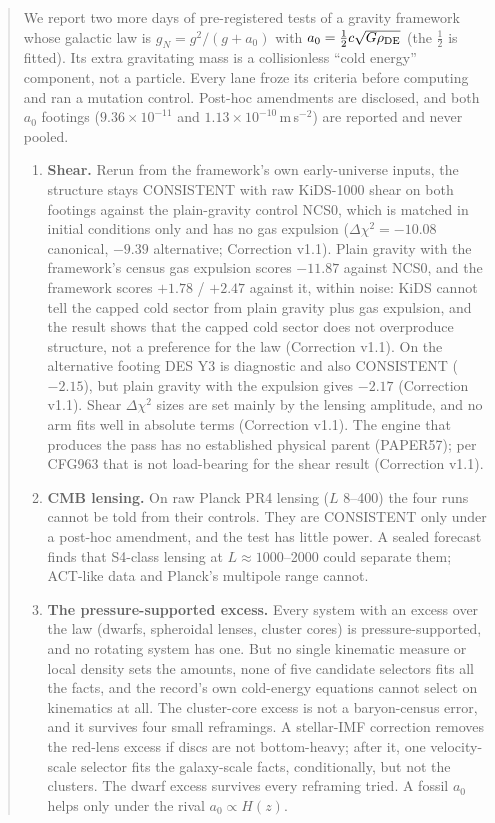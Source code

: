 \documentclass[10pt]{article}
\begin{document}
\begin{abstract}\noindent
We report two more days of pre-registered tests of a gravity framework whose galactic law is $g_N=g^2/(g+a_0)$ with $a_0=\tfrac12 c\sqrt{G\rho_{\rm DE}}$ (the $\tfrac12$ is fitted). Its extra gravitating mass is a collisionless ``cold energy'' component, not a particle. Every lane froze its criteria before computing and ran a mutation control. Post-hoc amendments are disclosed, and both $a_0$ footings ($9.36\times10^{-11}$ and $1.13\times10^{-10}$\,m\,s$^{-2}$) are reported and never pooled.
\begin{enumerate}
\item \textbf{Shear.} Rerun from the framework's own early-universe inputs, the structure stays CONSISTENT with raw KiDS-1000 shear on both footings against the plain-gravity control NCS0, which is matched in initial conditions only and has no gas expulsion ($\Delta\chi^2=-10.08$ canonical, $-9.39$ alternative; Correction v1.1). Plain gravity with the framework's census gas expulsion scores $-11.87$ against NCS0, and the framework scores $+1.78$ / $+2.47$ against it, within noise: KiDS cannot tell the capped cold sector from plain gravity plus gas expulsion, and the result shows that the capped cold sector does not overproduce structure, not a preference for the law (Correction v1.1). On the alternative footing DES Y3 is diagnostic and also CONSISTENT ($-2.15$), but plain gravity with the expulsion gives $-2.17$ (Correction v1.1). Shear $\Delta\chi^2$ sizes are set mainly by the lensing amplitude, and no arm fits well in absolute terms (Correction v1.1). The engine that produces the pass has no established physical parent (PAPER57); per CFG963 that is not load-bearing for the shear result (Correction v1.1).
\item \textbf{CMB lensing.} On raw Planck PR4 lensing ($L$ 8--400) the four runs cannot be told from their controls. They are CONSISTENT only under a post-hoc amendment, and the test has little power. A sealed forecast finds that S4-class lensing at $L\approx1000$--2000 could separate them; ACT-like data and Planck's multipole range cannot.
\item \textbf{The pressure-supported excess.} Every system with an excess over the law (dwarfs, spheroidal lenses, cluster cores) is pressure-supported, and no rotating system has one. But no single kinematic measure or local density sets the amounts, none of five candidate selectors fits all the facts, and the record's own cold-energy equations cannot select on kinematics at all. The cluster-core excess is not a baryon-census error, and it survives four small reframings. A stellar-IMF correction removes the red-lens excess if discs are not bottom-heavy; after it, one velocity-scale selector fits the galaxy-scale facts, conditionally, but not the clusters. The dwarf excess survives every reframing tried. A fossil $a_0$ helps only under the rival $a_0\propto H(z)$.
\end{enumerate}
\end{abstract}
\end{document}
